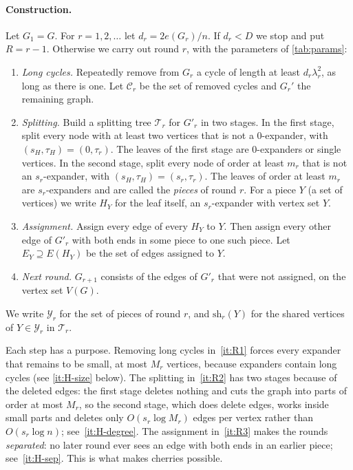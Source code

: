 \documentclass[11pt]{article}
\theoremstyle{definition}
\theoremstyle{remark}
\numberwithin{equation}{section}
\numberwithin{figure}{section}
\numberwithin{table}{section}
\newcommand{\cC}{\mathcal{C}}
\newcommand{\cT}{\mathcal{T}}
\newcommand{\cY}{\mathcal{Y}}
\newcommand{\sh}{\mathrm{sh}}
\begin{document}
\paragraph{Construction.} Let $G_1=G$. For $r=1,2,\dots$ let
$d_r=2e(G_r)/n$. If $d_r<D$ we stop and put $R=r-1$. Otherwise we carry out
round $r$, with the parameters of \cref{tab:params}:
\begin{enumerate}[label=(R\arabic*),leftmargin=3.2em,itemsep=2pt]
\item\label{it:R1} \emph{Long cycles.} Repeatedly remove from $G_r$ a cycle of
length at least $d_r\lambda_r^2$, as long as there is one. Let $\cC_r$ be the
set of removed cycles and $G_r'$ the remaining graph.
\item\label{it:R2} \emph{Splitting.} Build a splitting tree $\cT_r$ for $G'_r$ in
two stages. In the first stage, split every node with at least two vertices
that is not a $0$-expander, with $(s_H,\tau_H)=(0,\tau_r)$. The leaves of the
first stage are $0$-expanders or single vertices. In the second stage, split
every node of order at least $m_r$ that is not an $s_r$-expander, with
$(s_H,\tau_H)=(s_r,\tau_r)$. The leaves of order at least $m_r$ are
$s_r$-expanders and are called the \emph{pieces} of round $r$. For a piece $Y$
(a set of vertices) we write $H_Y$ for the leaf itself, an $s_r$-expander with
vertex set $Y$.
\item\label{it:R3} \emph{Assignment.} Assign every edge of every $H_Y$ to $Y$.
Then assign every other edge of $G'_r$ with both ends in some piece to one such
piece. Let $E_Y\supseteq E(H_Y)$ be the set of edges assigned to $Y$.
\item\label{it:R4} \emph{Next round.} $G_{r+1}$ consists of the edges of $G'_r$
that were not assigned, on the vertex set $V(G)$.
\end{enumerate}
We write $\cY_r$ for the set of pieces of round $r$, and $\sh_r(Y)$ for the
shared vertices of $Y\in\cY_r$ in $\cT_r$.

Each step has a purpose. Removing long cycles in~\ref{it:R1} forces every
expander that remains to be small, at most $M_r$ vertices, because expanders
contain long cycles (see \ref{it:H-size} below). The splitting in~\ref{it:R2} has
two stages because of the deleted edges: the first stage deletes nothing and
cuts the graph into parts of order at most $M_r$, so the second stage, which
does delete edges, works inside small parts and deletes only $O(s_r\log M_r)$
edges per vertex rather than $O(s_r\log n)$; see~\ref{it:H-degree}. The assignment
in~\ref{it:R3} makes the rounds \emph{separated}: no later round ever sees an
edge with both ends in an earlier piece; see~\ref{it:H-sep}. This is what makes
cherries possible.
\end{document}
